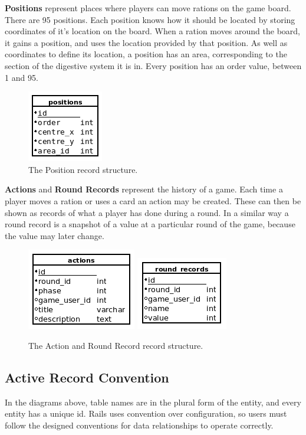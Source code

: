 \textbf{Positions} represent places where players can move rations on the game board. There are 95 positions. Each position knows how it should be located by storing coordinates of it's location on the board. When a ration moves around the board, it gains a position, and uses the location provided by that position. As well as coordinates to define its location, a position has an area, corresponding to the section of the digestive system it is in. Every position has an order value, between 1 and 95.
\begin{figure}[ht]
\centering
\includegraphics{Images/2/positions}
\caption{The Position record structure.}
\label{2_model_position}
\end{figure}

\textbf{Actions} and \textbf{Round Records} represent the history of a game. Each time a player moves a ration or uses a card an action may be created. These can then be shown as records of what a player has done during a round. In a similar way a round record is a snapshot of a value at a particular round of the game, because the value may later change.
\begin{figure}[ht]
\centering
\includegraphics{Images/2/actions}
\includegraphics{Images/2/round_records}
\caption{The Action and Round Record record structure.}
\label{2_model_position}
\end{figure}


\subsection{Active Record Convention}
In the diagrams above, table names are in the plural form of the entity, and every entity has a unique id. Rails uses convention over configuration, so users must follow the designed conventions for data relationships to operate correctly.

